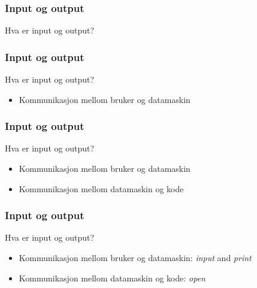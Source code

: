 
\begin{frame}
    \frametitle{Input og output}

    Hva er input og output?

\end{frame}

\begin{frame}
    \frametitle{Input og output}

    Hva er input og output?

    \begin{itemize}
        \item Kommunikasjon mellom bruker og datamaskin
    \end{itemize}

\end{frame}

\begin{frame}
    \frametitle{Input og output}

    Hva er input og output?

    \begin{itemize}
        \item Kommunikasjon mellom bruker og datamaskin
        \item Kommunikasjon mellom datamaskin og kode
    \end{itemize}

\end{frame}

\begin{frame}
    \frametitle{Input og output}

    Hva er input og output?

    \begin{itemize}
        \item Kommunikasjon mellom bruker og datamaskin: \textit{input} and \textit{print}
        \item Kommunikasjon mellom datamaskin og kode: \textit{open}
    \end{itemize}

\end{frame}
